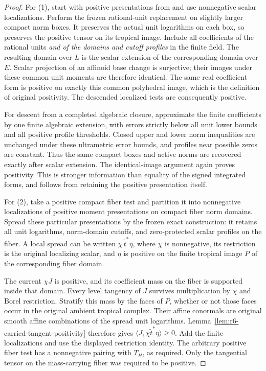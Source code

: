 \documentclass[11pt,a4paper]{article}
\numberwithin{equation}{section}
\theoremstyle{definition}
\theoremstyle{remark}
\begin{document}
\begin{proof}
For (1), start with positive presentations from
\cite[Definition 5.3.1]{CLD12} and use nonnegative scalar
localizations. Perform the frozen rational-unit replacement on
slightly larger compact norm boxes. It preserves the actual unit
logarithms on each box, so preserves the positive tensor on its
tropical image. Include all coefficients of the rational units
\emph{and of the domains and cutoff profiles} in the finite field.
The resulting domain over $L$ is the scalar extension of the
corresponding domain over $E$. Scalar projection of an affinoid
base change is surjective; their images under these common unit
moments are therefore identical. The same real coefficient form is
positive on exactly this common polyhedral image, which is the
definition of original positivity. The descended localized tests
are consequently positive.

For descent from a completed algebraic closure, approximate the
finite coefficients by one finite algebraic extension, with errors
strictly below all unit lower bounds and all positive profile
thresholds. Closed upper and lower norm inequalities are unchanged
under these ultrametric error bounds, and profiles near possible
zeros are constant. Thus the same compact boxes and active norms
are recovered exactly after scalar extension. The identical-image
argument again proves positivity. This is stronger information
than equality of the signed integrated forms, and follows from
retaining the positive presentation itself.

For (2), take a positive compact fiber test and partition it into
nonnegative localizations of positive moment presentations on
compact fiber norm domains. Spread these particular presentations
by the frozen exact construction: it retains all unit logarithms,
norm-domain cutoffs, and zero-protected scalar profiles on the
fiber. A local spread can be written $\chi\,\widetilde t^*\eta$,
where $\chi$ is nonnegative, its restriction is the original
localizing scalar, and $\eta$ is positive on the finite tropical
image $P$ of the corresponding fiber domain.

The current $\chi J$ is positive, and its coefficient mass on the
fiber is supported inside that domain. Every level tangency of $J$
survives multiplication by $\chi$ and Borel restriction. Stratify
this mass by the faces of $P$, whether or not those faces occur in
the original ambient tropical complex. Their affine conormals are
original smooth affine combinations of the spread unit logarithms.
Lemma~\ref{lem:r6-carried-tangent-positivity} therefore gives
$\langle J,\chi\widetilde t^*\eta\rangle\geq0$. Add the finite
localizations and use the displayed restriction identity. The
arbitrary positive fiber test has a nonnegative pairing with
$T_H$, as required. Only the tangential tensor on the mass-carrying
fiber was required to be positive.
\end{proof}
\end{document}
